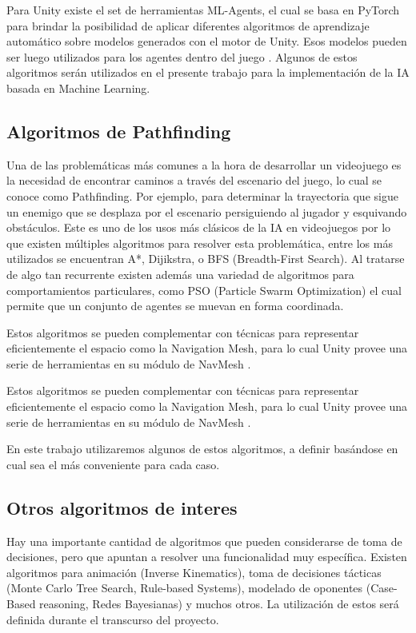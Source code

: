 \documentclass[a4paper]{article}
\begin{document}
Para Unity existe el set de herramientas ML-Agents, el cual se basa en PyTorch para brindar la posibilidad de aplicar diferentes algoritmos de aprendizaje automático sobre modelos generados con el motor de Unity. Esos modelos pueden ser luego utilizados para los agentes dentro del juego \cite{an_evaluation_of_the_unity_machine_learning_agents_toolkit}. Algunos de estos algoritmos serán utilizados en el presente trabajo para la implementación de la IA basada en Machine Learning.

\subsection{Algoritmos de Pathfinding}

Una de las problemáticas más comunes a la hora de desarrollar un videojuego es la necesidad de encontrar caminos a través del escenario del juego, lo cual se conoce como Pathfinding. Por ejemplo, para determinar la trayectoria que sigue un enemigo que se desplaza por el escenario persiguiendo al jugador y esquivando obstáculos. Este es uno de los usos más clásicos de la IA en videojuegos por lo que existen múltiples algoritmos para resolver esta problemática, entre los más utilizados se encuentran A*, Dijikstra, o BFS (Breadth-First Search). Al tratarse de algo tan recurrente existen además una variedad de algoritmos para comportamientos particulares, como PSO (Particle Swarm Optimization) el cual permite que un conjunto de agentes se muevan en forma coordinada.

Estos algoritmos se pueden complementar con técnicas para representar eficientemente el espacio como la Navigation Mesh, para lo cual Unity provee una serie de herramientas en su módulo de NavMesh \cite{unity_artificial_intelligence_programming}.

Estos algoritmos se pueden complementar con técnicas para representar eficientemente el espacio como la Navigation Mesh, para lo cual Unity provee una serie de herramientas en su módulo de NavMesh \cite{unity_artificial_intelligence_programming}.

En este trabajo utilizaremos algunos de estos algoritmos, a definir basándose en cual sea el más conveniente para cada caso.

\subsection{Otros algoritmos de interes}

Hay una importante cantidad de algoritmos que pueden considerarse de toma de decisiones, pero que apuntan a resolver una funcionalidad muy específica. Existen algoritmos para animación (Inverse Kinematics), toma de decisiones tácticas (Monte Carlo Tree Search, Rule-based Systems), modelado de oponentes (Case-Based reasoning, Redes Bayesianas) y muchos otros. La utilización de estos será definida durante el transcurso del proyecto.
\end{document}

